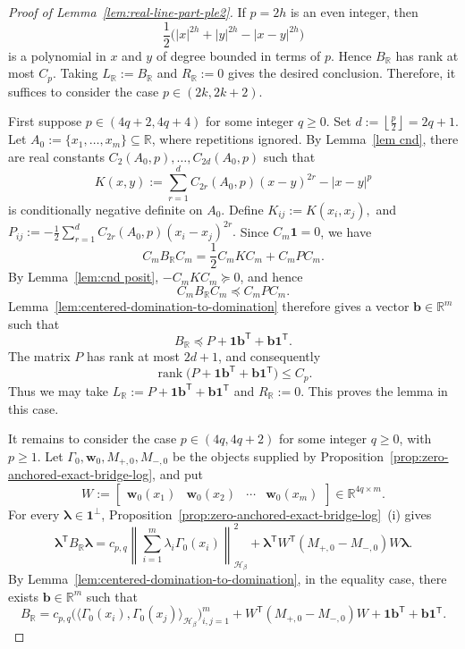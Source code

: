 \documentclass[11pt]{article}
\theoremstyle{definition}
\newcommand{\R}{\mathbb R}
\begin{document}
\begin{proof}[Proof of Lemma~\ref{lem:real-line-part-ple2}]
 If \(p=2h\) is an even integer, then
\[
\frac12\bigl(|x|^{2h}+|y|^{2h}-|x-y|^{2h}\bigr)
\]
is a polynomial in \(x\) and \(y\) of degree bounded in terms of \(p\). Hence
\(B_{\R}\) has rank at most \(C_p\). Taking
\(
L_{\R}:=B_{\R}\) and
\(
R_{\R}:=0
\)
gives the desired conclusion.
Therefore, it suffices to consider the case $p\in(2k,2k+2)$.	

First suppose
\(
p\in(4q+2,4q+4)
\)
for some integer \(q\ge0\). Set
\(
d:=\left\lfloor\frac p2\right\rfloor=2q+1.
\)
Let \(A_0:=\{x_1,\dots,x_m\}\subseteq\R\), where repetitions ignored. By
Lemma~\ref{lem cnd}, there are real constants
$C_2(A_0,p), \dots, C_{2d}(A_0,p)$ such that
\[
K(x,y):=\sum_{r=1}^d C_{2r}(A_0,p)(x-y)^{2r}-|x-y|^p
\]
is conditionally negative definite on \(A_0\). Define
\(
K_{ij}:=K(x_i,x_j),\) and
\(
P_{ij}:=-\frac12\sum_{r=1}^d C_{2r}(A_0,p)(x_i-x_j)^{2r}.
\)
Since \(C_m \mathbf{1}=0\), we have
\[
C_mB_{\R}C_m
=
\frac12 C_mKC_m+C_mPC_m.
\]
By Lemma~\ref{lem:cnd posit}, \(-C_mKC_m\succeq0\), and hence
\[
C_mB_{\R}C_m\preceq C_mPC_m.
\]
Lemma~\ref{lem:centered-domination-to-domination} therefore gives a vector
\(\boldsymbol{b}\in\R^m\) such that
\[
B_{\R}\preceq P+\boldsymbol{1}\boldsymbol{b}^{\mathsf T}+\boldsymbol{b}\boldsymbol{1}^{\mathsf T}.
\]
The matrix \(P\) has rank at most \(2d+1\), and consequently
\[
\operatorname{rank}\bigl(P+\boldsymbol{1}\boldsymbol{b}^{\mathsf T}
+\boldsymbol{b}\boldsymbol{1}^{\mathsf T}\bigr)\le C_p.
\]
Thus we may take
\(
L_{\R}:=P+\boldsymbol{1}\boldsymbol{b}^{\mathsf T}+\boldsymbol{b}\boldsymbol{1}^{\mathsf T}\)
and \(
R_{\R}:=0.
\)
This proves the lemma in this case.

It remains to consider the case \(p\in(4q,4q+2)\) for some integer \(q\ge0\), with \(p\ge1\).
Let
\(\Gamma_0,\boldsymbol w_0,M_{+,0},M_{-,0}\) be the objects supplied by
Proposition~\ref{prop:zero-anchored-exact-bridge-log}, and put
\[
W:=
\begin{bmatrix}
\boldsymbol w_0(x_1)&\boldsymbol w_0(x_2)&\cdots&\boldsymbol w_0(x_m)
\end{bmatrix}
\in\R^{4q\times m}.
\]
For every \(\boldsymbol\lambda\in\boldsymbol{1}^{\perp}\), Proposition~\ref{prop:zero-anchored-exact-bridge-log}~(i) gives
\[
\boldsymbol\lambda^{\mathsf T}B_{\R}\boldsymbol\lambda
=
c_{p,q}\left\|\sum_{i=1}^m\lambda_i\Gamma_0(x_i)\right\|_{\mathcal H_\beta}^2
+
\boldsymbol\lambda^{\mathsf T}W^{\mathsf T}(M_{+,0}-M_{-,0})W\boldsymbol\lambda.
\]
By Lemma~\ref{lem:centered-domination-to-domination}, in the equality case, there
exists \(\boldsymbol{b}\in\R^m\) such that
\[
B_{\R}
=
c_{p,q}\bigl(\langle\Gamma_0(x_i),\Gamma_0(x_j)\rangle_{\mathcal H_\beta}\bigr)_{i,j=1}^m
+
W^{\mathsf T}(M_{+,0}-M_{-,0})W
+
\boldsymbol{1}\boldsymbol{b}^{\mathsf T}+\boldsymbol{b}\boldsymbol{1}^{\mathsf T}.
\]


\end{proof}
\end{document}
